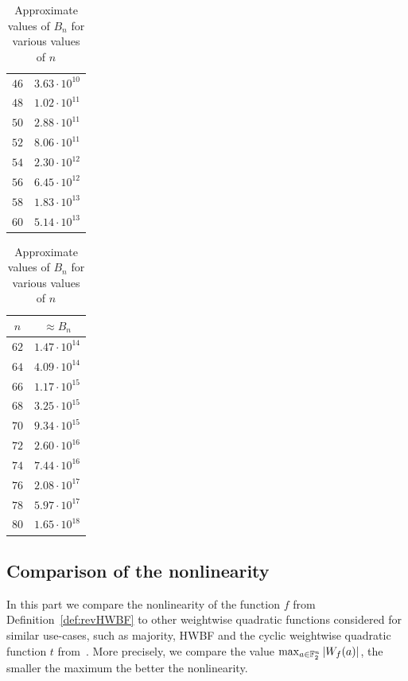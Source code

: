 \documentclass[11pt]{llncs}
\begin{document}
\begin{table}
\begin{minipage}{0.24\textwidth}
\begin{tabular}{|c|c|}
			$46$ & $3.63 \cdot 10^{10}$ \\
			$48$ & $1.02 \cdot 10^{11}$ \\
			$50$ & $2.88 \cdot 10^{11}$ \\
			$52$ & $8.06 \cdot 10^{11}$ \\
			$54$ & $2.30 \cdot 10^{12}$ \\
			$56$ & $6.45 \cdot 10^{12}$ \\
			$58$ & $1.83 \cdot 10^{13}$ \\
			$60$ & $5.14 \cdot 10^{13}$ \\
			\hline
		\end{tabular}
	\end{minipage}%
	\begin{minipage}{0.24\textwidth}
		\centering
		\begin{tabular}{|c|c|}
			\hline
			$n$ & $\approx B_n$ \\
			\hline
			$62$ & $1.47 \cdot 10^{14}$ \\
			$64$ & $4.09 \cdot 10^{14}$ \\
			$66$ & $1.17 \cdot 10^{15}$ \\
			$68$ & $3.25 \cdot 10^{15}$ \\
			$70$ & $9.34 \cdot 10^{15}$ \\
			$72$ & $2.60 \cdot 10^{16}$ \\
			$74$ & $7.44 \cdot 10^{16}$ \\
			$76$ & $2.08 \cdot 10^{17}$ \\
			$78$ & $5.97 \cdot 10^{17}$ \\
			$80$ & $1.65 \cdot 10^{18}$ \\
			\hline
		\end{tabular}
	\end{minipage}
	\caption{Approximate values of $B_n$ for various values of $n$}
	\label{table:walsh_bounds}
\end{table}



\subsection{Comparison of the nonlinearity}


In this part we compare the nonlinearity of the function $f$ from Definition~\ref{def:revHWBF} to other weightwise quadratic functions considered for similar use-cases, such as majority, HWBF and the cyclic weightwise quadratic function $t$  from~\cite{DAM:MeaOza24}. 
More precisely, we compare the value $\max_{a\in\mathbb F_2^n}|W_{f}(a)|$, the smaller the maximum the better the nonlinearity. 
\end{document}
